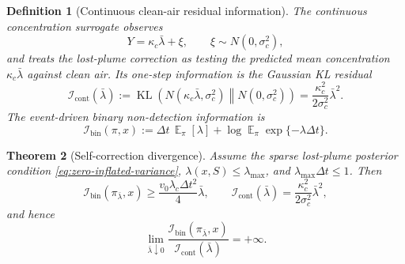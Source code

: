 \documentclass[11pt]{article}
\newtheorem{theorem}{Theorem}
\newtheorem{definition}[theorem]{Definition}
\DeclareMathOperator{\E}{\mathbb{E}}
\DeclareMathOperator{\KL}{\mathrm{KL}}
\newcommand{\dt}{\Delta t}
\newcommand{\Ibin}{\mathcal{I}_{\mathrm{bin}}}
\newcommand{\Icont}{\mathcal{I}_{\mathrm{cont}}}
\begin{document}
\begin{definition}[Continuous clean-air residual information]\label{def:continuous-information}
The continuous concentration surrogate observes
\[
        Y=\kappa_c\bar{\lambda}+\xi,\qquad \xi\sim N(0,\sigma_c^2),
\]
and treats the lost-plume correction as testing the predicted mean concentration $\kappa_c\bar{\lambda}$ against clean air.  Its one-step information is the Gaussian KL residual
\begin{equation}
        \Icont(\bar{\lambda})
        :=
        \KL\!\left(N(\kappa_c\bar{\lambda},\sigma_c^2)\middle\|N(0,\sigma_c^2)\right)
        =
        \frac{\kappa_c^2}{2\sigma_c^2}\bar{\lambda}^2.
        \label{eq:continuous-kl}
\end{equation}
The event-driven binary non-detection information is
\begin{equation}
        \Ibin(\pi,x)
        :=
        \dt\,\E_{\pi}[\lambda]+\log\E_{\pi}\exp\{-\lambda\dt\}.
        \label{eq:binary-ndi}
\end{equation}
\end{definition}

\begin{theorem}[Self-correction divergence]\label{thm:p1-self-correction}
Assume the sparse lost-plume posterior condition \eqref{eq:zero-inflated-variance}, $\lambda(x,S)\leq \lambda_{\max}$, and $\lambda_{\max}\dt\leq 1$.  Then
\begin{equation}
        \Ibin(\pi_{\bar{\lambda}},x)
        \geq
        \frac{v_0\lambda_c\dt^2}{4}\bar{\lambda},
        \qquad
        \Icont(\bar{\lambda})
        =
        \frac{\kappa_c^2}{2\sigma_c^2}\bar{\lambda}^2,
        \label{eq:p1-rates}
\end{equation}
and hence
\begin{equation}
        \lim_{\bar{\lambda}\downarrow 0}
        \frac{\Ibin(\pi_{\bar{\lambda}},x)}{\Icont(\bar{\lambda})}
        =
        +\infty .
        \label{eq:p1-divergence}
\end{equation}
\end{theorem}
\end{document}
